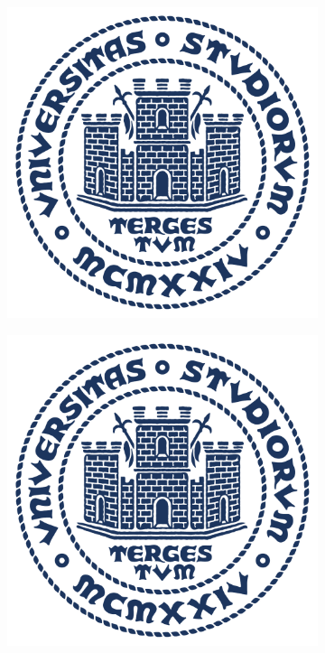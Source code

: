     \begin{figure}[h]
        \begin{subfigure}[t]{0.5\textwidth}
            \includegraphics[width=0.9\linewidth]{img/units_sigillo_pantone-534}
        \end{subfigure}
        \begin{subfigure}[t]{0.5\textwidth}
            \includegraphics[width=0.9\linewidth]{img/units_sigillo_pantone-534}

\end{subfigure}
\end{figure}
